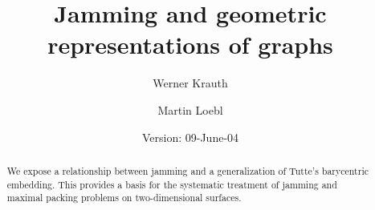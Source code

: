 \documentclass[invmat]{svjour}
\begin{document}
\newcommand{\tit}[5]{{\sl #5.}\ #1\ {\bf #2}, #3 (#4)}
\newcommand{\CCAL}{\mathcal{C}}
\newcommand{\ECAL}{\mathcal{E}}
\newcommand{\SCAL}{\mathcal{S}}
\newcommand{\MCAL}{\mathcal{M}}
\newcommand{\OCAL}{\mathcal{O}}
\newcommand{\VEC}[1]{\mathbf{#1}}
\newcommand{\TO}{,\ldots,}
\newcommand{\avec}{\VEC{a}}
\newcommand{\bvec}{\VEC{b}}
\newcommand{\cvec}{\VEC{c}}
\newcommand{\rvec}{\VEC{r}}
\newcommand{\Rvec}{\VEC{R}}
\newcommand{\xvec}{\VEC{x}}
\newcommand{\alphavec}{\boldsymbol{\alpha}}
\newcommand{\betavec}{\boldsymbol{\beta}}
\newcommand{\gammavec}{\boldsymbol{\gamma}}
\newcommand{\deltavec}{\boldsymbol{\delta}}
\newcommand{\alphabar}{\overline{\alpha}}
\newcommand{\scal}[2]{\mean{#1,  #2}}
\newcommand{\mean}[1]{\langle #1 \rangle}
\newcommand{\eq}[1]{eq.~(\ref{#1})}
\newcommand{\EQ}[1]{~(\ref{#1})}
\newcommand{\ddist}[1]{|#1|_{\gamma}}
\newcommand{\sect}[1]{Section~\ref{#1}}
\newcommand{\fig}[1]{Fig.~\ref{#1}}
\newcommand{\lem}[1]{Lemma~\ref{#1}}
\newcommand{\cor}[1]{Corrolary~\ref{#1}}
\newcommand{\prop}[1]{Proposition~\ref{#1}}
\newcommand{\conj}[1]{Conjecture~\ref{#1}}
\newcommand{\M}{\ensuremath{\MCAL}}
\newcommand{\half}{\tfrac{1}{2}}
\newcommand{\pred}{ooo}
\newcommand{\mq}[2]{\uwave{#1}{\marginpar{\footnotesize #2}}}
\newcommand{\ww}[1]{\uwave{#1}}
\newcommand{\mm}[1]{\uwave{#1}}
%
%
\title{Jamming and geometric representations of graphs}
\author{Werner Krauth \and Martin Loebl}
\date{Version: 09-June-04}
\maketitle
\begin{abstract}
We expose a relationship between jamming and a
generalization of Tutte's barycentric embedding. This provides a basis
for the systematic treatment of jamming and maximal packing problems on
two-dimensional surfaces.
\end{abstract}
\end{document}
